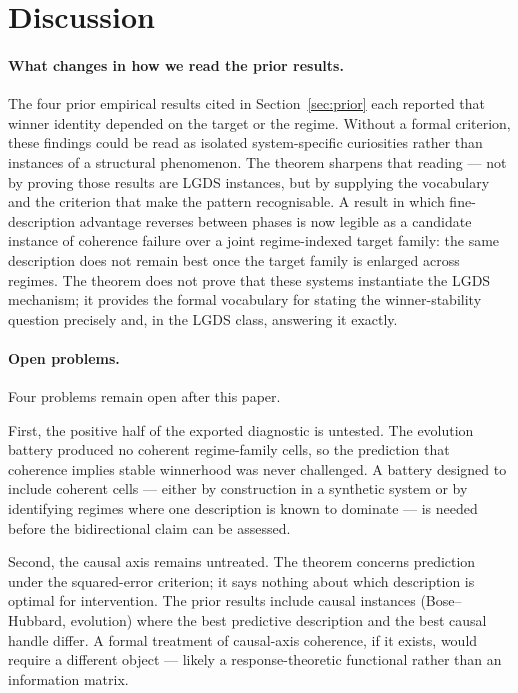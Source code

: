 \documentclass[11pt]{article}
\begin{document}

\section{Discussion}
\label{sec:discussion}

\paragraph{What changes in how we read the prior results.}
The four prior empirical results cited in Section~\ref{sec:prior} each
reported that winner identity depended on the target or the regime.
Without a formal criterion, these findings could be read as isolated
system-specific curiosities rather than instances of a structural
phenomenon.
The theorem sharpens that reading --- not by proving those results are LGDS
instances, but by supplying the vocabulary and the criterion that make
the pattern recognisable.
A result in which fine-description advantage reverses between phases is now
legible as a candidate instance of coherence failure over a joint
regime-indexed target family: the same description does not remain best
once the target family is enlarged across regimes.
The theorem does not prove that these systems instantiate the LGDS mechanism;
it provides the formal vocabulary for stating the winner-stability question
precisely and, in the LGDS class, answering it exactly.

\paragraph{Open problems.}
Four problems remain open after this paper.

First, the positive half of the exported diagnostic is untested.
The evolution battery produced no coherent regime-family cells,
so the prediction that coherence implies stable winnerhood was never
challenged.
A battery designed to include coherent cells --- either by construction in
a synthetic system or by identifying regimes where one description is
known to dominate --- is needed before the bidirectional claim can be
assessed.

Second, the causal axis remains untreated.
The theorem concerns prediction under the squared-error criterion;
it says nothing about which description is optimal for intervention.
The prior results include causal instances (Bose--Hubbard, evolution)
where the best predictive description and the best causal handle differ.
A formal treatment of causal-axis coherence, if it exists, would require
a different object --- likely a response-theoretic functional rather than
an information matrix.
\end{document}

